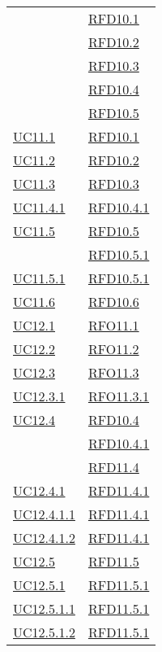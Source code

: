 \begin{longtable}{|>{\centering}m{5cm}|m{5cm}<{\centering}|}
& \hyperlink{RFD10.1}{RFD10.1}\\
& \hyperlink{RFD10.2}{RFD10.2}\\
& \hyperlink{RFD10.3}{RFD10.3}\\
& \hyperlink{RFD10.4}{RFD10.4}\\
& \hyperlink{RFD10.5}{RFD10.5}\\ \hline
\hyperref[UC11.1]{UC11.1} & \hyperlink{RFD10.1}{RFD10.1}\\ \hline
\hyperref[UC11.2]{UC11.2} & \hyperlink{RFD10.2}{RFD10.2}\\ \hline
\hyperref[UC11.3]{UC11.3} & \hyperlink{RFD10.3}{RFD10.3}\\ \hline
\hyperref[UC11.4.1]{UC11.4.1} & \hyperlink{RFD10.4.1}{RFD10.4.1}\\ \hline
\hyperref[UC11.5]{UC11.5} & \hyperlink{RFD10.5}{RFD10.5}\\
& \hyperlink{RFD10.5.1}{RFD10.5.1}\\ \hline
\hyperref[UC11.5.1]{UC11.5.1} & \hyperlink{RFD10.5.1}{RFD10.5.1}\\ \hline
\hyperref[UC11.6]{UC11.6} & \hyperlink{RFD10.6}{RFD10.6}\\ \hline
\hyperref[UC12.1]{UC12.1} & \hyperlink{RFO11.1}{RFO11.1}\\ \hline
\hyperref[UC12.2]{UC12.2} & \hyperlink{RFO11.2}{RFO11.2}\\ \hline
\hyperref[UC12.3]{UC12.3} & \hyperlink{RFO11.3}{RFO11.3}\\ \hline
\hyperref[UC12.3.1]{UC12.3.1} & \hyperlink{RFO11.3.1}{RFO11.3.1}\\ \hline
\hyperref[UC12.4]{UC12.4} & \hyperlink{RFD10.4}{RFD10.4}\\
& \hyperlink{RFD10.4.1}{RFD10.4.1}\\
& \hyperlink{RFD11.4}{RFD11.4}\\ \hline
\hyperref[UC12.4.1]{UC12.4.1} & \hyperlink{RFD11.4.1}{RFD11.4.1}\\ \hline
\hyperref[UC12.4.1.1]{UC12.4.1.1} & \hyperlink{RFD11.4.1}{RFD11.4.1}\\ \hline
\hyperref[UC12.4.1.2]{UC12.4.1.2} & \hyperlink{RFD11.4.1}{RFD11.4.1}\\ \hline
\hyperref[UC12.5]{UC12.5} & \hyperlink{RFD11.5}{RFD11.5}\\ \hline
\hyperref[UC12.5.1]{UC12.5.1} & \hyperlink{RFD11.5.1}{RFD11.5.1}\\ \hline
\hyperref[UC12.5.1.1]{UC12.5.1.1} & \hyperlink{RFD11.5.1}{RFD11.5.1}\\ \hline
\hyperref[UC12.5.1.2]{UC12.5.1.2} & \hyperlink{RFD11.5.1}{RFD11.5.1}\\ \hline

\end{longtable}
